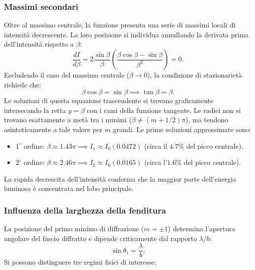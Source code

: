 \documentclass[a4paper,11pt]{report}
\begin{document}
\subsubsection{Massimi secondari}
Oltre al massimo centrale, la funzione presenta una serie di massimi locali di intensità decrescente. La loro posizione si individua annullando la derivata prima dell'intensità rispetto a $\beta$:
\begin{equation}
    \frac{dI}{d\beta} = 2 \frac{\sin\beta}{\beta} \left( \frac{\beta\cos\beta - \sin\beta}{\beta^2} \right) = 0.
\end{equation}
Escludendo il caso del massimo centrale ($\beta \to 0$), la condizione di stazionarietà richiede che:
\begin{equation}
    \beta\cos\beta = \sin\beta \implies \tan\beta = \beta.
\end{equation}
Le soluzioni di questa equazione trascendente si trovano graficamente intersecando la retta $y=\beta$ con i rami della funzione tangente. Le radici non si trovano esattamente a metà tra i minimi ($\beta \neq (m+1/2)\pi$), ma tendono asintoticamente a tale valore per $m$ grandi.
Le prime soluzioni approssimate sono:
\begin{itemize}
    \item $1^\circ$ ordine: $\beta \approx 1.43\pi \implies I_1 \approx I_0 (0.0472)$ (circa il $4.7\%$ del picco centrale).
    \item $2^\circ$ ordine: $\beta \approx 2.46\pi \implies I_2 \approx I_0 (0.0165)$ (circa l'$1.6\%$ del picco centrale).
\end{itemize}
La rapida decrescita dell'intensità conferma che la maggior parte dell'energia luminosa è concentrata nel lobo principale.

\subsubsection{Influenza della larghezza della fenditura}
La posizione del primo minimo di diffrazione ($m = \pm 1$) determina l'apertura angolare del fascio diffratto e dipende criticamente dal rapporto $\lambda/b$:
\begin{equation}
    \sin\theta_1 = \frac{\lambda}{b}.
\end{equation}
Si possono distinguere tre regimi fisici di interesse:
\end{document}
